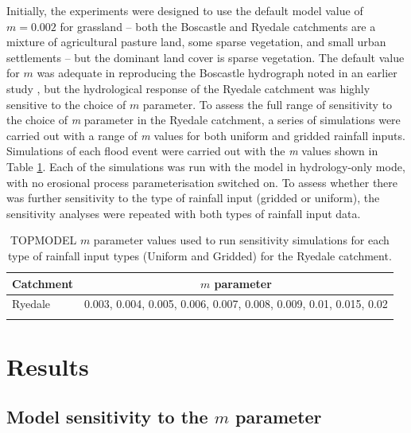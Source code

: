 Initially, the experiments were designed to use the default model value of \(m = 0.002\) for grassland -- both the Boscastle and Ryedale catchments are a mixture of agricultural pasture land, some sparse vegetation, and small urban settlements -- but the dominant land cover is sparse vegetation. The default value for \(m\) was adequate in reproducing the Boscastle hydrograph noted in an earlier study \citep{wallingford2005flooding}, but the hydrological response of the Ryedale catchment was highly sensitive to the choice of \(m\) parameter. To assess the full range of sensitivity to the choice of \textit{m} parameter in the Ryedale catchment, a series of simulations were carried out with a range of \textit{m} values for both uniform and gridded rainfall inputs. Simulations of each flood event were carried out with the \textit{m} values shown in Table \ref{table-m-sens}. Each of the simulations was run with the model in hydrology-only mode, with no erosional process parameterisation switched on. To assess whether there was further sensitivity to the type of rainfall input (gridded or uniform), the sensitivity analyses were repeated with both types of rainfall input data.

\begin{table}
\begin{tabular}{lc}
\textbf{Catchment} & \textbf{\(m\) parameter} \\
\hline
Ryedale     & 0.003, 0.004, 0.005, 0.006, 0.007, 0.008, 0.009, 0.01, 0.015, 0.02  \\
\hline
\\ 
\end{tabular}
\caption{TOPMODEL \(m\) parameter values used to run sensitivity simulations for each type of rainfall input types (Uniform and Gridded) for the Ryedale catchment. }
\label{table-m-sens}
\end{table}

\section{Results}

\subsection{Model sensitivity to the \(m\) parameter}

